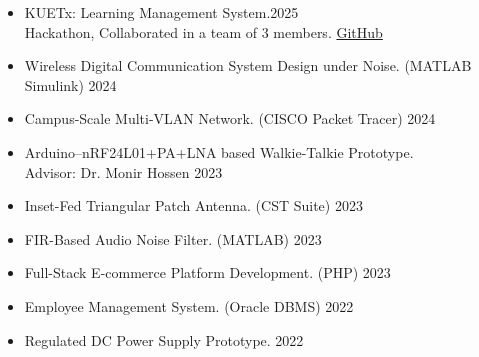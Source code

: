 \begin{itemize}
  \item KUETx: Learning Management System.\hfill 2025\\Hackathon, Collaborated in a team of 3 members. \href{https://github.com/Learnathon-By-Geeky-Solutions/seagull}{GitHub}
  \item Wireless Digital Communication System Design under Noise. (MATLAB Simulink) \hfill 2024
  \item Campus-Scale Multi-VLAN Network. (CISCO Packet Tracer) \hfill 2024
  \item Arduino–nRF24L01+PA+LNA based Walkie-Talkie Prototype. \\Advisor: Dr. Monir Hossen \hfill 2023
  \item Inset-Fed Triangular Patch Antenna. (CST Suite) \hfill 2023
  \item FIR-Based Audio Noise Filter. (MATLAB) \hfill 2023
  \item Full-Stack E-commerce Platform Development. (PHP) \hfill 2023
  \item Employee Management System. (Oracle DBMS) \hfill 2022
  \item Regulated DC Power Supply Prototype. \hfill 2022
\end{itemize}
